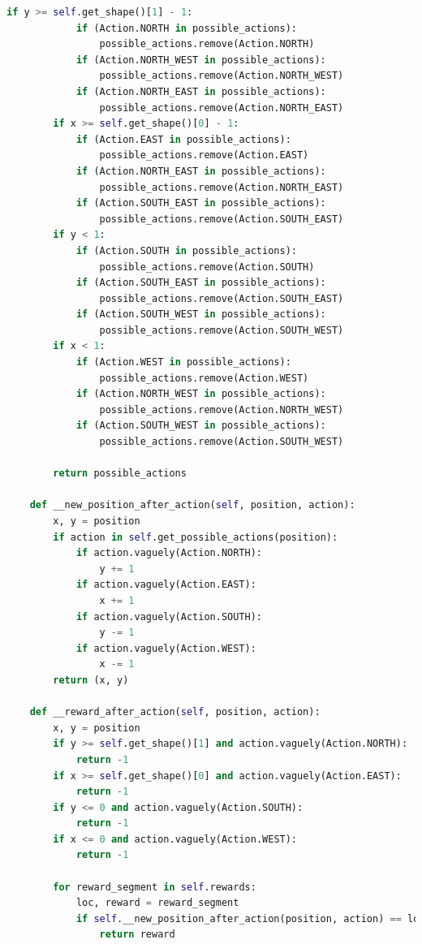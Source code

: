 \documentclass[11pt,journal,transmag,final]{IEEEtran}
\begin{document}
\begin{appendices}
\begin{lstlisting}[language=Python, caption=Classes, basicstyle=\footnotesize, label=lst:classes]
        if y >= self.get_shape()[1] - 1:
            if (Action.NORTH in possible_actions):
                possible_actions.remove(Action.NORTH)
            if (Action.NORTH_WEST in possible_actions):
                possible_actions.remove(Action.NORTH_WEST)
            if (Action.NORTH_EAST in possible_actions):
                possible_actions.remove(Action.NORTH_EAST)
        if x >= self.get_shape()[0] - 1:
            if (Action.EAST in possible_actions):
                possible_actions.remove(Action.EAST)
            if (Action.NORTH_EAST in possible_actions):
                possible_actions.remove(Action.NORTH_EAST)
            if (Action.SOUTH_EAST in possible_actions):
                possible_actions.remove(Action.SOUTH_EAST)
        if y < 1:
            if (Action.SOUTH in possible_actions):
                possible_actions.remove(Action.SOUTH)
            if (Action.SOUTH_EAST in possible_actions):
                possible_actions.remove(Action.SOUTH_EAST)
            if (Action.SOUTH_WEST in possible_actions):
                possible_actions.remove(Action.SOUTH_WEST)
        if x < 1:
            if (Action.WEST in possible_actions):
                possible_actions.remove(Action.WEST)
            if (Action.NORTH_WEST in possible_actions):
                possible_actions.remove(Action.NORTH_WEST)
            if (Action.SOUTH_WEST in possible_actions):
                possible_actions.remove(Action.SOUTH_WEST)
            
        return possible_actions
    
    def __new_position_after_action(self, position, action):
        x, y = position
        if action in self.get_possible_actions(position):
            if action.vaguely(Action.NORTH):
                y += 1
            if action.vaguely(Action.EAST):
                x += 1
            if action.vaguely(Action.SOUTH):
                y -= 1
            if action.vaguely(Action.WEST):
                x -= 1
        return (x, y)
    
    def __reward_after_action(self, position, action):
        x, y = position
        if y >= self.get_shape()[1] and action.vaguely(Action.NORTH):
            return -1
        if x >= self.get_shape()[0] and action.vaguely(Action.EAST):
            return -1
        if y <= 0 and action.vaguely(Action.SOUTH):
            return -1
        if x <= 0 and action.vaguely(Action.WEST):
            return -1
        
        for reward_segment in self.rewards:
            loc, reward = reward_segment
            if self.__new_position_after_action(position, action) == loc:
                return reward
        

\end{lstlisting}
\end{appendices}
\end{document}
